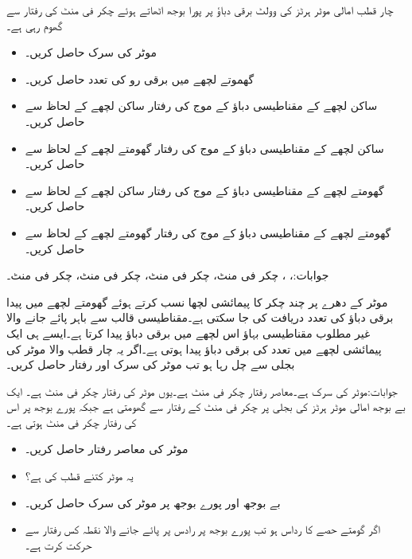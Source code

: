 چار قطب امالی موٹر  ہرٹز کی  وولٹ برقی دباؤ پر پورا بوجھ اٹھاتے ہوئے  چکر فی منٹ کی رفتار سے گھوم رہی ہے۔
\begin{itemize}
\item
موٹر کی سرک  حاصل کریں۔
\item
گھموتے لچھے میں برقی رو کی تعدد حاصل کریں۔
\item
ساکن لچھے کے مقناطیسی دباؤ کے موج کی رفتار ساکن لچھے کے لحاظ سے حاصل کریں۔
\item
ساکن لچھے کے مقناطیسی دباؤ کے موج کی رفتار گھومتے لچھے کے لحاظ  سے حاصل کریں۔
\item
گھومتے لچھے کے مقناطیسی دباؤ کے موج کی رفتار ساکن لچھے کے لحاظ سے حاصل کریں۔
\item
گھومتے لچھے کے مقناطیسی دباؤ کے موج کی رفتار گھومتے لچھے کے لحاظ سے حاصل کریں۔
\end{itemize} 

جوابات:، ،  چکر فی منٹ،  چکر فی منٹ،  چکر فی منٹ،  چکر فی منٹ۔

موٹر کے دھرے پر چند چکر کا پیمائشی لچھا نسب کرتے ہوئے گھومتے لچھے میں پیدا برقی دباؤ  کی تعدد دریافت کی جا سکتی ہے۔مقناطیسی قالب سے باہر پائے جانے والا غیر مطلوب مقناطیسی بہاؤ اس لچھے میں برقی دباؤ پیدا کرتا ہے۔ایسے ہی ایک پیمائشی لچھے میں  تعدد  کی برقی دباؤ پیدا ہوتی ہے۔اگر یہ چار قطب والا موٹر  کی بجلی سے چل رہا ہو تب موٹر کی سرک اور رفتار حاصل کریں۔

 جوابات:موٹر کی سرک  ہے۔معاصر رفتار  چکر فی منٹ ہے۔یوں موٹر کی رفتار   چکر فی منٹ ہے۔
ایک بے بوجھ امالی موٹر  ہرٹز کی بجلی پر  چکر فی منٹ کے رفتار سے گھومتی ہے جبکہ پورے بوجھ پر اس کی رفتار   چکر فی منٹ ہوتی ہے۔
\begin{itemize}
\item
موٹر کی معاصر رفتار حاصل کریں۔ 
 \item
یہ موٹر کتنے قطب کی ہے؟
\item
بے بوجھ اور پورے بوجھ پر موٹر کی سرک حاصل کریں۔
\item
اگر گومتے حصے کا رداس  ہو تب پورے بوجھ پر رادس پر پائے جانے والا نقطہ کس رفتار سے حرکت کرت ہے۔ 
\end{itemize}

